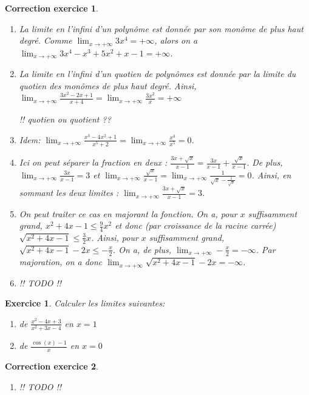 \documentclass[12pt]{article}
\newtheorem{exercice}{\bf Exercice}
\newtheorem{correction}{\bf Correction exercice}
\newenvironment{exo}{
\begin{exercice}\smallskip\normalfont}{\end{exercice}
}
\newenvironment{cor}{
\begin{correction}\smallskip\normalfont}{\end{correction}
}
\newif\ifcorrige\corrigetrue
\begin{document}
\ifcorrige
\color{magenta}
\begin{cor}
$\qquad$
\begin{enumerate}
\item La limite en l'infini d'un polyn\^ome est donn\'ee par son mon\^ome de plus haut degr\'e.
  Comme $\lim_{x \to + \infty} 3x^4 = + \infty$,
  alors on a $\lim_{x \to + \infty} 3x^4  - x^3 + 5x^2 + x - 1= + \infty$.

\item La limite en l'infini d'un quotien de polyn\^omes est donn\'ee par la limite
  du quotien des mon\^omes de plus haut degr\'e.
  Ainsi, $\lim_{x \to +\infty}\frac{3x^2-2x+1}{x+4} = \lim_{x \to +\infty}\frac{3x^2}{x} = + \infty$

  !! quotien ou quotient ??

\item Idem:
  $\lim_{x \to + \infty} \frac{x^3-4x^2+1}{x^5+2} = \lim_{x \to + \infty} \frac{x^3}{x^5} = 0$.

\item Ici on peut s\'eparer la fraction en deux :
  $\frac{3x+\sqrt{x}}{x-1} = \frac{3x}{x-1} + \frac{\sqrt{x}}{x-1}$.
  De plus, $\lim_{x \to + \infty}\frac{3x}{x-1} = 3$
  et $\lim_{x \to + \infty}\frac{\sqrt{x}}{x-1}
  = \lim_{x \to + \infty}\frac{1}{\sqrt{x}-\frac1{\sqrt{x}}} = 0$.
  Ainsi, en sommant les deux limites : $\lim_{x \to +\infty}\frac{3x+\sqrt{x}}{x-1} = 3$.

\item On peut traiter ce cas en majorant la fonction.
  On a, pour $x$ suffisamment grand, $x^2 + 4x - 1 \leq \frac94 x^2$ et donc
  (par croissance de la racine carr\'ee)
  $\sqrt{x^2 + 4x - 1} \leq \frac32 x$.
  Ainsi, pour $x$ suffisamment grand, $\sqrt{x^2 + 4x - 1} - 2x \leq - \frac{x}2$.
  On a, de plus, $\lim_{x \to +\infty} - \frac{x}2 = -\infty$.
  Par majoration, on a donc $\lim_{x \to +\infty} \sqrt{x^2 + 4x - 1} - 2x = -\infty$.

\item !! TODO !!
  
\end{enumerate}
\end{cor}
\color{black}
\fi



\begin{exo} Calculer les limites suivantes:
\begin{multicols}{3}
\begin{enumerate}
\item de $\frac{x^2-4x+3}{x^2+3x-4}$ en $x=1$
\item de $\frac{\cos(x) - 1}{x}$ en $x=0$
\end{enumerate}
\end{multicols}
\end{exo}

\ifcorrige
\color{magenta}
\begin{cor}
$\qquad$
\begin{enumerate}
\item !! TODO !!
\end{enumerate}
\end{cor}
\color{black}
\fi

\end{document}
